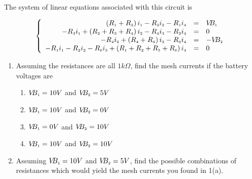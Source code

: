 \begin{ex}
The system of linear equations associated with this circuit is

\[ \left\{ \begin{array}{rcl} \left(R_{\mbox{\tiny$1$}} + R_{\mbox{\tiny$3$}}\right)i_{\mbox{\tiny$1$}} - R_{\mbox{\tiny$3$}}i_{\mbox{\tiny$2$}} - R_{\mbox{\tiny$1$}}i_{\mbox{\tiny$4$}} & = & V\!\!B_{\mbox{\tiny$1$}} \\
-R_{\mbox{\tiny$3$}}i_{\mbox{\tiny$1$}} + \left(R_{\mbox{\tiny$2$}} + R_{\mbox{\tiny$3$}} + R_{\mbox{\tiny$4$}}\right)i_{\mbox{\tiny$2$}} - R_{\mbox{\tiny$4$}}i_{\mbox{\tiny$3$}} - R_{\mbox{\tiny$2$}}i_{\mbox{\tiny$4$}} & = & 0 \\
-R_{\mbox{\tiny$4$}}i_{\mbox{\tiny$2$}} + \left(R_{\mbox{\tiny$4$}} + R_{\mbox{\tiny$6$}}\right)i_{\mbox{\tiny$3$}} - R_{\mbox{\tiny$6$}}i_{\mbox{\tiny$4$}} & = & -V\!\!B_{\mbox{\tiny$2$}} \\
-R_{\mbox{\tiny$1$}}i_{\mbox{\tiny$1$}} - R_{\mbox{\tiny$2$}}i_{\mbox{\tiny$2$}} - R_{\mbox{\tiny$6$}}i_{\mbox{\tiny$3$}} + \left(R_{\mbox{\tiny$1$}} + R_{\mbox{\tiny$2$}} + R_{\mbox{\tiny$5$}} + R_{\mbox{\tiny$6$}}\right)i_{\mbox{\tiny$4$}} & = & 0 \\  \end{array} \right.\]

\begin{enumerate}

\item  Assuming the resistances are all $1 k\Omega$, find the mesh currents if the battery voltages are

\begin{enumerate}

\item  $V\!\!B_{\mbox{\tiny$1$}} = 10 V$ and $V\!\!B_{\mbox{\tiny$2$}} = 5 V$

\item  $V\!\!B_{\mbox{\tiny$1$}} = 10 V$ and $V\!\!B_{\mbox{\tiny$2$}} = 0 V$

\item  $V\!\!B_{\mbox{\tiny$1$}} = 0 V$ and $V\!\!B_{\mbox{\tiny$2$}} = 10 V$

\item  $V\!\!B_{\mbox{\tiny$1$}} = 10 V$ and $V\!\!B_{\mbox{\tiny$2$}} = 10 V$

\end{enumerate} 

\item  Assuming $V\!\!B_{\mbox{\tiny$1$}} = 10 V$ and $V\!\!B_{\mbox{\tiny$2$}} = 5 V$, find the possible combinations of resistances which would yield the mesh currents you found in 1(a).


\end{enumerate}
\end{ex}
